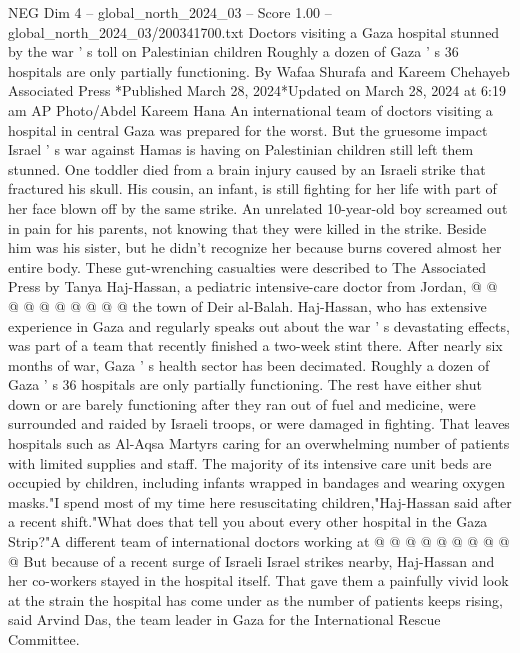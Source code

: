 \begin{textsample}{NEG Dim 4 – global\_north\_2024\_03 – Score 1.00 – global\_north\_2024\_03/200341700.txt}  \label{ex:f4_neg_215}
Doctors visiting a Gaza hospital stunned by the war ' s toll on Palestinian children Roughly a dozen of Gaza ' s 36 hospitals are only partially functioning.
By Wafaa Shurafa and Kareem Chehayeb Associated Press *Published March 28, 2024*Updated on March 28, 2024 at 6:19 am AP Photo/Abdel Kareem Hana An international team of doctors visiting a hospital in central Gaza was prepared for the worst.
But the gruesome impact Israel ' s war against Hamas is having on Palestinian children still left them stunned.
One toddler died from a brain injury caused by an Israeli strike that fractured his skull.
His cousin, an infant, is still fighting for her life with part of her face blown off by the same strike.
An unrelated 10-year-old boy screamed out in pain for his parents, not knowing that they were killed in the strike.
Beside him was his sister, but he didn't recognize her because burns covered almost her entire body.
These gut-wrenching casualties were described to The Associated Press by Tanya Haj-Hassan, a pediatric intensive-care doctor from Jordan, @ @ @ @ @ @ @ @ @ @ the town of Deir al-Balah.
Haj-Hassan, who has extensive experience in Gaza and regularly speaks out about the war ' s devastating effects, was part of a team that recently finished a two-week stint there.
After nearly six months of war, Gaza ' s health sector has been decimated.
Roughly a dozen of Gaza ' s 36 hospitals are only partially functioning.
The rest have either shut down or are barely functioning after they ran out of fuel and medicine, were surrounded and raided by Israeli troops, or were damaged in fighting.
That leaves hospitals such as Al-Aqsa Martyrs caring for an overwhelming number of patients with limited supplies and staff.
The majority of its intensive care unit beds are occupied by children, including infants wrapped in bandages and wearing oxygen masks."I spend most of my time here resuscitating children,"Haj-Hassan said after a recent shift."What does that tell you about every other hospital in the Gaza Strip?"A different team of international doctors working at @ @ @ @ @ @ @ @ @ @ But because of a recent surge of Israeli Israel strikes nearby, Haj-Hassan and her co-workers stayed in the hospital itself.
That gave them a painfully vivid look at the strain the hospital has come under as the number of patients keeps rising, said Arvind Das, the team leader in Gaza for the International Rescue Committee.

\end{textsample}
